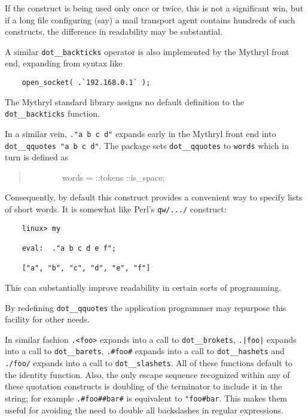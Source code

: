 If the construct is being used only once or twice, this is not a 
significant win, but if a long file configuring (say) a 
mail transport agent contains hundreds of such constructs, the 
difference in readability may be substantial.

A similar {\tt dot\_\_backticks} operator is also implemented by 
the Mythryl front end, expanding from syntax like

\begin{verbatim}
    open_socket( .`192.168.0.1` );
\end{verbatim}

The Mythryl standard library assigns no default definition to 
the {\tt dot\_\_backticks} function.

In a similar vein, {\tt ."a b c d"} expands early in the Mythryl front  
end into {\tt dot\_\_qquotes "a b c d"}. 
The   
package sets {\tt dot\_\_qquotes} to {\tt words} which in turn is defined as

\begin{quotation}
~~~~~~~~words  = ::tokens ::is\_space;
\end{quotation}

Consequently, by default this construct provides a convenient way 
to specify lists of short words.  It is somewhat like Perl's 
{\tt qw/.../} construct:

\begin{verbatim}
    linux> my

    eval:  ."a b c d e f";

    ["a", "b", "c", "d", "e", "f"]
\end{verbatim}

This can substantially improve readability in certain sorts of programming.

By redefining {\tt dot\_\_qquotes} the application programmer may repurpose 
this facility for other needs.

In similar fashion {\tt .<foo>} expands into a call to {\tt dot\_\_brokets},
{\tt .|foo|} expands into a call to {\tt dot\_\_barets}, {\tt .#foo#} expands 
into a call to {\tt dot\_\_hashets} and {\tt ./foo/} expands into a call to 
{\tt dot\_\_slashets}.  All of these functions default to the identity function. 
Also, the only escape sequence recognized within any of these quotation constructs 
is doubling of the terminator to include it in the string; for example {\tt .#foo##bar#} 
is equivalent to {\tt "foo#bar}.  This makes them useful for avoiding the need to 
double all backslashes in regular expressions.


